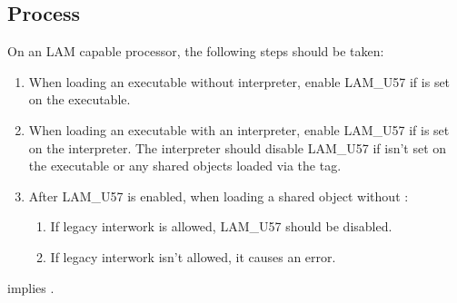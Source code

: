 \subsection{Process }
\label{lam_u57}

On an LAM capable processor, the following steps should be taken:

\begin{enumerate}
  \item
    \begin{sloppypar}
      When loading an executable without interpreter, enable LAM_U57
      if  is set on the
      executable.
    \end{sloppypar}
  \item
    \begin{sloppypar}
      When loading an executable with an interpreter, enable LAM_U57
      if  is set on the
      interpreter.  The interpreter should disable LAM_U57 if
       isn't set on the
      executable or any shared objects loaded via the 
      tag.
    \end{sloppypar}
  \item
    \begin{sloppypar}
      After LAM_U57 is enabled, when loading a shared object without
      :
      \begin{enumerate}
	\item If legacy interwork is allowed, LAM_U57 should be disabled.
	\item If legacy interwork isn't allowed, it causes an error.
      \end{enumerate}
    \end{sloppypar}
\end{enumerate}

 implies
.

